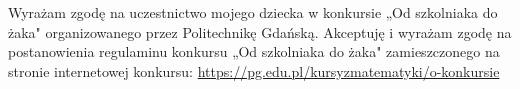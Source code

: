 \documentclass[10pt]{article}
\begin{document}
Wyrażam zgodę na uczestnictwo mojego dziecka w konkursie „Od szkolniaka do żaka" organizowanego przez Politechnikę Gdańską. Akceptuję i wyrażam zgodę na postanowienia regulaminu konkursu „Od szkolniaka do żaka" zamieszczonego na stronie internetowej konkursu: \href{https://pg.edu.pl/kursyzmatematyki/o-konkursie}{https://pg.edu.pl/kursyzmatematyki/o-konkursie}
\end{document}
